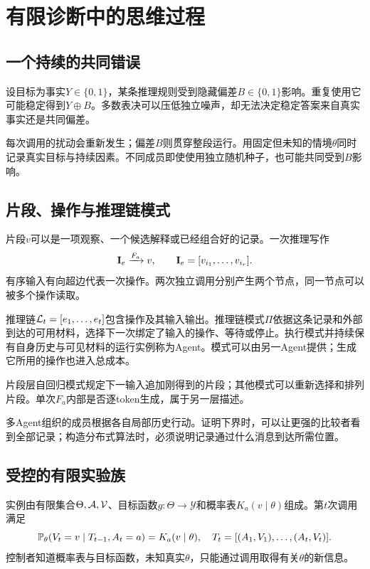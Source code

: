 \chapter{有限诊断中的思维过程}
\label{ch:model}

\section{一个持续的共同错误}
设目标为事实$Y\in\{0,1\}$，某条推理规则受到隐藏偏差$B\in\{0,1\}$影响。重复使用它可能稳定得到$Y\oplus B$。多数表决可以压低独立噪声，却无法决定稳定答案来自真实事实还是共同偏差。

每次调用的扰动会重新发生；偏差$B$则贯穿整段运行。用固定但未知的情境$\theta$同时记录真实目标与持续因素。不同成员即使使用独立随机种子，也可能共同受到$B$影响。

\section{片段、操作与推理链模式}
片段$v$可以是一项观察、一个候选解释或已经组合好的记录。一次推理写作
\[
 \mathbf I_e\xrightarrow{F_a}v,\qquad \mathbf I_e=[v_{i_1},\ldots,v_{i_r}].
\]
有序输入有向超边代表一次操作。两次独立调用分别产生两个节点，同一节点可以被多个操作读取。

推理链$\mathcal L_t=[e_1,\ldots,e_t]$包含操作及其输入输出。推理链模式$\Pi$依据这条记录和外部到达的可用材料，选择下一次绑定了输入的操作、等待或停止。执行模式并持续保有自身历史与可见材料的运行实例称为Agent。模式可以由另一Agent提供；生成它所用的操作也进入总成本。

片段层自回归模式规定下一输入追加刚得到的片段；其他模式可以重新选择和排列片段。单次$F_a$内部是否逐token生成，属于另一层描述。

多Agent组织的成员根据各自局部历史行动。证明下界时，可以让更强的比较者看到全部记录；构造分布式算法时，必须说明记录通过什么消息到达所需位置。

\section{受控的有限实验族}
\begin{definition}[诊断实例]
实例由有限集合$\Theta,\mathcal A,\mathcal V$、目标函数$g:\Theta\to\mathcal Y$和概率表$K_a(v\mid\theta)$组成。第$t$次调用满足
\begin{equation}
 \mathbb P_\theta(V_t=v\mid T_{t-1},A_t=a)=K_a(v\mid\theta),
 \quad T_t=[(A_1,V_1),\ldots,(A_t,V_t)].
 \label{eq:controlled}
\end{equation}
控制者知道概率表与目标函数，未知真实$\theta$，只能通过调用取得有关$\theta$的新信息。
\end{definition}

